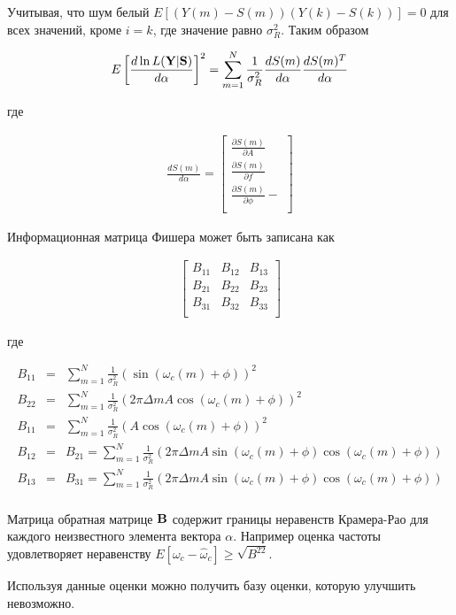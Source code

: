 Учитывая, что шум белый ${E \left[ (Y(m) - S(m))(Y(k) - S(k)) \right]=0}$ для всех значений, кроме ${i=k}$, где значение равно ${\sigma_R^2}$.
Таким образом
\begin{center}
\begin{eqnarray}
	E \left[  \frac{d \ln L({\bf Y}|{\bf S})}{d {\bf \alpha}} \right]^2 =
	\sum \limits_{m=1}^{N} \frac{1}{\sigma_R^2} \frac{d S(m)}{d \alpha} \frac{d S(m)^T}{d \alpha}
\end{eqnarray}
\end{center}
где
\begin{center}
\begin{eqnarray}
		\frac{d S(m)}{d \alpha} = 
		\left[ \begin{array}{c}
		\frac{\partial S(m)}{\partial A} \nonumber	\\
		\frac{\partial S(m)}{\partial f} 		\\
		\frac{\partial S(m)}{\partial \phi} \nonumber - 	\\
		\end{array} \right]
\end{eqnarray}
\end{center}
Информационная матрица Фишера может быть записана как
\begin{center}
\begin{eqnarray}
	\label{eq:crlb3_alpha}
		\left[ \begin{array}{ccc}
		B_{11} & B_{12} & B_{13}  \\
		B_{21} & B_{22} & B_{23}  \\
		B_{31} & B_{32} & B_{33}  \\
		\end{array} \right]
\end{eqnarray}
\end{center}
где
\begin{center}
\begin{eqnarray}
	B_{11} & = & \sum \limits_{m=1}^N \frac{1}{\sigma_R^2}(\sin(\omega_c(m)+\phi))^2 \\
	B_{22} & = & \sum \limits_{m=1}^N \frac{1}{\sigma_R^2}(2\pi \Delta m A \cos(\omega_c(m)+\phi))^2 \\
	B_{11} & = & \sum \limits_{m=1}^N \frac{1}{\sigma_R^2}(A\cos(\omega_c(m)+\phi))^2 \\
	B_{12} & = & B_{21} = \sum \limits_{m=1}^N \frac{1}{\sigma_R^2}(2\pi \Delta m A\sin(\omega_c(m)+\phi)\cos(\omega_c(m)+\phi)) \\
	B_{13} & = & B_{31} = \sum \limits_{m=1}^N \frac{1}{\sigma_R^2}(2\pi \Delta m A\sin(\omega_c(m)+\phi)\cos(\omega_c(m)+\phi)) \\
\end{eqnarray}
\end{center}

Матрица обратная матрице ${\bf B}$ содержит границы неравенств Крамера-Рао для каждого неизвестного элемента вектора ${\alpha}$. Например
оценка частоты удовлетворяет неравенству ${E[\omega_c - \hat{\omega}_c] \ge \sqrt{B^{22}}}$.

Используя данные оценки можно получить базу оценки, которую улучшить невозможно.

